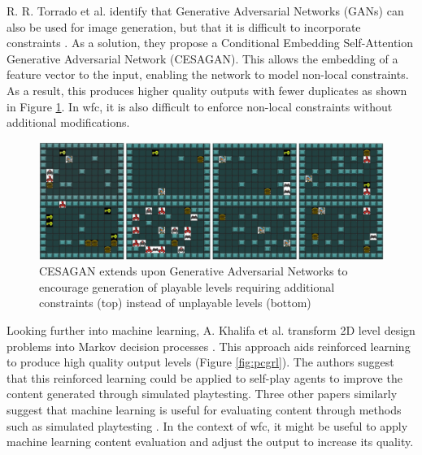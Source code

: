 R. R. Torrado et al. identify that Generative Adversarial Networks (GANs) can also be used for image generation, but that it is difficult to incorporate constraints \cite{CESAGAN}. As a solution, they propose a Conditional Embedding Self-Attention Generative Adversarial Network (CESAGAN). This allows the embedding of a feature vector to the input, enabling the network to model non-local constraints. As a result, this produces higher quality outputs with fewer duplicates as shown in Figure \ref{fig:cesagan}. In \acrshort{wfc}, it is also difficult to enforce non-local constraints without additional modifications.

\begin{figure}[H]
    \centering
    \includegraphics[width=\textwidth, height=0.3\textheight, keepaspectratio]{Images/CESAGAN.jpg}
    \caption{CESAGAN extends upon Generative Adversarial Networks to encourage generation of playable levels requiring additional constraints (top) instead of unplayable levels (bottom) \cite{CESAGAN}}
    \label{fig:cesagan}
\end{figure}

Looking further into machine learning, A. Khalifa et al. transform 2D level design problems into Markov decision processes \cite{Markov_PCGRL}. This approach aids reinforced learning to produce high quality output levels (Figure \ref{fig:pcgrl}). The authors suggest that this reinforced learning could be applied to self-play agents to improve the content generated through simulated playtesting. Three other papers similarly suggest that machine learning is useful for evaluating content through methods such as simulated playtesting \cite{DeepLearningPCG, VGDL_ASP, PCGML}. In the context of \acrshort{wfc}, it might be useful to apply machine learning content evaluation and adjust the output to increase its quality.

